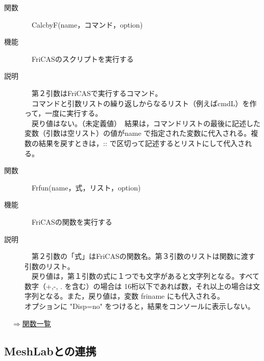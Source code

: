 \documentclass[papersize,a4paper,12pt,uplatex]{jsarticle}
\begin{document}
\begin{description}

\hypertarget{calcbyF}{}
\item[関数]　CalcbyF(name，コマンド，option)
\item[機能]　FriCASのスクリプトを実行する
\item[説明]　第２引数はFriCASで実行するコマンド。\\
　コマンドと引数リストの繰り返しからなるリスト（例えばcmdL）を作って，一度に実行する。\\
　戻り値はない。（未定義値）　結果は，コマンドリストの最後に記述した変数（引数は空リスト）の値がname で指定された変数に代入される。複数の結果を戻すときは，:: で区切って記述するとリストにして代入される。\\

\hypertarget{frfun}{}
\item[関数]　Frfun(name，式，リスト，option)
\item[機能]　FriCASの関数を実行する
\item[説明]　第２引数の「式」はFriCASの関数名。第３引数のリストは関数に渡す引数のリスト。\\
　戻り値は，第１引数の式に１つでも文字があると文字列となる。すべて数字（+,-, . を含む）の場合は
16桁以下であれば数，それ以上の場合は文字列となる。また，戻り値は，変数 friname にも代入される。\\
オプションに "Disp=no" をつけると，結果をコンソールに表示しない。\\

\end{description}
\begin{flushright}　\hyperlink{functionlist}{$\Rightarrow$関数一覧}\end{flushright}

\newpage

\subsection{MeshLabとの連携}
\end{document}
